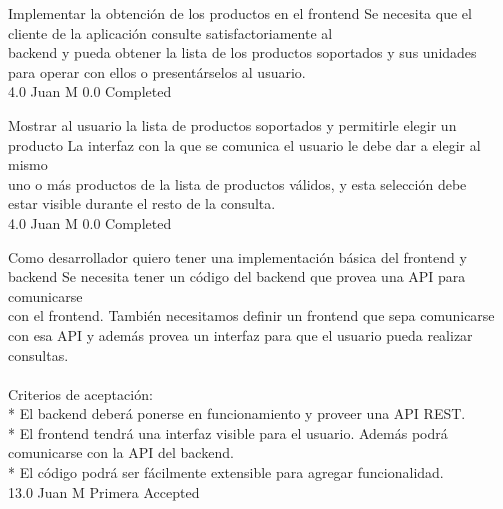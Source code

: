		{Implementar la obtención de los productos en el frontend} %
		{Se necesita que el cliente de la aplicación consulte satisfactoriamente al\\
backend y pueda obtener la lista de los productos soportados y sus unidades\\
para operar con ellos o presentárselos al usuario.\\
} %
		{4.0} %
		{Juan M} %
		{0.0} %
		{Completed} %

		{Mostrar al usuario la lista de productos soportados y permitirle elegir un producto} %
		{La interfaz con la que se comunica el usuario le debe dar a elegir al mismo\\
uno o más productos de la lista de productos válidos, y esta selección debe\\
estar visible durante el resto de la consulta.\\
} %
		{4.0} %
		{Juan M} %
		{0.0} %
		{Completed} %


\vspace{20pt}

	{Como desarrollador quiero tener una implementación básica del frontend y backend} %
	{Se necesita tener un código del backend que provea una API para comunicarse\\
con el frontend. También necesitamos definir un frontend que sepa comunicarse\\
con esa API y además provea un interfaz para que el usuario pueda realizar\\
consultas.\\
  \\
Criterios de aceptación:\\
* El backend deberá ponerse en funcionamiento y proveer una API REST.  \\
* El frontend tendrá una interfaz visible para el usuario. Además podrá comunicarse con la API del backend.  \\
* El código podrá ser fácilmente extensible para agregar funcionalidad.\\
} %
	{} %
	{13.0} %
	{Juan M} %
	{Primera} %
	{Accepted} %

